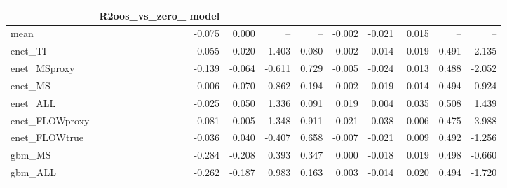 \begin{tabular}{lrrrrrrrrr}
\toprule
 & R2oos_vs_zero_%
model &  &  &  &  &  &  &  &  &  \\
\midrule
mean & -0.075 & 0.000 & -- & -- & -0.002 & -0.021 & 0.015 & -- & -- \\
enet_TI & -0.055 & 0.020 & 1.403 & 0.080 & 0.002 & -0.014 & 0.019 & 0.491 & -2.135 \\
enet_MSproxy & -0.139 & -0.064 & -0.611 & 0.729 & -0.005 & -0.024 & 0.013 & 0.488 & -2.052 \\
enet_MS & -0.006 & 0.070 & 0.862 & 0.194 & -0.002 & -0.019 & 0.014 & 0.494 & -0.924 \\
enet_ALL & -0.025 & 0.050 & 1.336 & 0.091 & 0.019 & 0.004 & 0.035 & 0.508 & 1.439 \\
enet_FLOWproxy & -0.081 & -0.005 & -1.348 & 0.911 & -0.021 & -0.038 & -0.006 & 0.475 & -3.988 \\
enet_FLOWtrue & -0.036 & 0.040 & -0.407 & 0.658 & -0.007 & -0.021 & 0.009 & 0.492 & -1.256 \\
gbm_MS & -0.284 & -0.208 & 0.393 & 0.347 & 0.000 & -0.018 & 0.019 & 0.498 & -0.660 \\
gbm_ALL & -0.262 & -0.187 & 0.983 & 0.163 & 0.003 & -0.014 & 0.020 & 0.494 & -1.720 \\
\bottomrule
\end{tabular}
